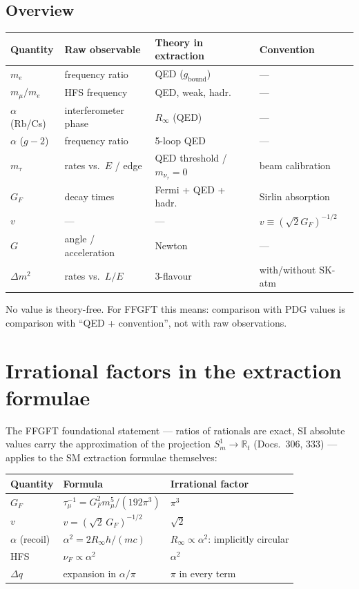\subsection{Overview}

\begin{center}
\begin{tabular}{@{}llll@{}}
\toprule
Quantity & Raw observable & Theory in extraction & Convention \\
\midrule
$m_e$ & frequency ratio & QED ($g_\text{bound}$) & --- \\
$m_\mu/m_e$ & HFS frequency & QED, weak, hadr. & --- \\
$\alpha$ (Rb/Cs) & interferometer phase & $R_\infty$ (QED) & --- \\
$\alpha$ ($g-2$) & frequency ratio & 5-loop QED & --- \\
$m_\tau$ & rates vs.\ $E$ / edge & QED threshold / $m_{\nu_\tau}=0$ & beam calibration \\
$G_F$ & decay times & Fermi + QED + hadr. & Sirlin absorption \\
$v$ & --- & --- & $v\equiv(\sqrt2G_F)^{-1/2}$ \\
$G$ & angle / acceleration & Newton & --- \\
$\Delta m^2$ & rates vs.\ $L/E$ & 3-flavour & with/without SK-atm \\
\bottomrule
\end{tabular}
\end{center}

No value is theory-free. For FFGFT this means: comparison with PDG values is comparison with ``QED + convention'', not with raw observations.

\section{Irrational factors in the extraction formulae}

The FFGFT foundational statement --- ratios of rationals are exact, SI absolute values carry the approximation of the projection $S^1_m\to\mathbb R_t$ (Docs.~306, 333) --- applies to the SM extraction formulae themselves:

\begin{center}
\begin{tabular}{@{}lll@{}}
\toprule
Quantity & Formula & Irrational factor \\
\midrule
$G_F$ & $\tau_\mu^{-1}=G_F^2m_\mu^5/(192\pi^3)$ & $\pi^3$ \\
$v$ & $v=(\sqrt2\,G_F)^{-1/2}$ & $\sqrt2$ \\
$\alpha$ (recoil) & $\alpha^2=2R_\infty h/(mc)$ & $R_\infty\propto\alpha^2$: implicitly circular \\
HFS & $\nu_F\propto\alpha^2$ & $\alpha^2$ \\
$\Delta q$ & expansion in $\alpha/\pi$ & $\pi$ in every term \\
\bottomrule
\end{tabular}
\end{center}

